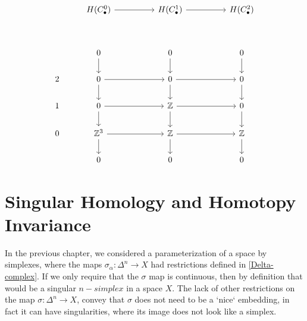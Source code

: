 \documentclass[11pt,a4paper]{report}
\begin{document}
       \[
     \begin{tikzcd}[ampersand replacement=\&]
            \& H(C_\bullet^0)   \arrow[rr]                                     \&  \& H(C_\bullet^1) \arrow[rr]                               \&  \& H(C_\bullet^2)                                                                 \\ \\
            \& 0 \arrow[d]                                         \&  \& 0 \arrow[d]                                         \&  \& 0 \arrow[d]                                                                 \\
            2 \& 0 \arrow[rr] \arrow[d]            \&  \& 0 \arrow[rr] \arrow[d]            \&  \& 0 \arrow[d] \\
            1 \& 0 \arrow[d] \arrow[rr]            \&  \& \mathbb{Z} \arrow[rr] \arrow[d]                   \&  \& 0 \arrow[d]                                              \\
            0 \& \mathbb{Z}^3 \arrow[d] \arrow[rr] \&  \& \mathbb{Z} \arrow[rr] \arrow[d] \&  \& \mathbb{Z} \arrow[d]                                    \\
            \& 0                                                   \&  \& 0                                                   \&  \& 0
    \end{tikzcd}
         \]

     \chapter{Singular Homology and Homotopy Invariance}
        \label{SingularHomology}


     In the previous chapter, we considered a parameterization of a space by simplexes, where the maps $\sigma_\alpha: \Delta^n \rightarrow X$ had restrictions defined in \ref{Delta-complex}. If we only require that the $\sigma$ map is continuous, then by definition that would be a singular $n-simplex$ in a space $X$.
     The lack of other restrictions on the map $\sigma: \Delta^n \rightarrow X$, convey that $\sigma$ does not need to be a `nice` embedding, in fact it can have singularities, where its image does not look like a simplex.
\end{document}
